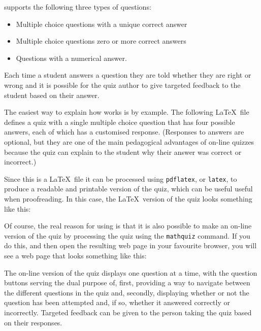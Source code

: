 \documentclass[svgnames]{article}
\begin{document}
    \MathQuiz supports the following three types of questions:
    \begin{itemize}
      \item Multiple choice questions with a unique correct answer
      \item Multiple choice questions zero or more correct answers
      \item Questions with a numerical answer.
    \end{itemize}
    Each time a student answers a question they are told whether they
    are right or wrong and it is possible for the quiz author to give
    targeted feedback to the student based on their answer.

    The easiest way to explain how \MathQuiz works is by example. The
    following \LaTeX\ file defines a quiz with a single multiple choice
    question that has four possible answers, each of which has a
    customised response.  (Responses to answers are optional, but they
    are one of the main pedagogical advantages of on-line quizzes
    because the quiz can explain to the student why their answer was
    correct or incorrect.)

    

    Since this is a \LaTeX\ file it can be processed using
    \texttt{pdflatex}, or \texttt{latex}, to produce a readable and
    printable version of the quiz, which can be useful useful when
    proofreading. In this case, the \LaTeX\ version of the quiz looks
    something like this:


    Of course, the real reason for using \MathQuiz is that it is also
    possible to make an on-line version of the quiz by processing the
    quiz using the \texttt{mathquiz} command. If you do this, and then open
    the resulting web page in your favourite browser, you will see a web page
    that looks something like this:


    The on-line version of the quiz displays one question at a time,
    with the question buttons serving the dual purpose of, first,
    providing a way to navigate between the different questions in the
    quiz and, secondly, displaying whether or not the question has been
    attempted and, if so, whether it answered correctly or incorrectly.
    Targeted feedback can be given to the person taking the quiz based
    on their responses.
\end{document}
